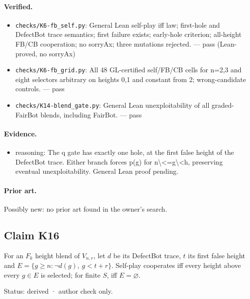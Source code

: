 \documentclass{article}
\begin{document}
\paragraph{Verified.}
\begin{itemize}
\item \texttt{checks/K6-fb\_self.py}: General Lean self-play iff law; first-hole and DefectBot trace semantics; first failure exists; early-hole criterion; all-height FB/CB cooperation; no sorryAx; three mutations rejected. --- pass (Lean-proved, no sorryAx)
\item \texttt{checks/K6-fb\_grid.py}: All 48 GL-certified self/FB/CB cells for n=2,3 and eight selectors arbitrary on heights 0,1 and constant from 2; wrong-candidate controls. --- pass
\item \texttt{checks/K14-blend\_gate.py}: General Lean unexploitability of all graded-FairBot blends, including FairBot. --- pass
\end{itemize}

\paragraph{Evidence.}
\begin{itemize}
\item reasoning: The q gate has exactly one hole, at the first false height of the DefectBot trace. Either branch forces p(g) for n\textbackslash{}\textless{}=g\textbackslash{}\textless{}h, preserving eventual unexploitability. General Lean proof pending.
\end{itemize}

\paragraph{Prior art.} Possibly new: no prior art found in the owner's search.

\subsection*{Claim K16}

For an $F_k$ height blend of $V_{n,r}$, let $d$ be its DefectBot trace, $t$ its first false height and $E=\{g\ge n:\neg d(g),\ g<t+r\}$. Self-play cooperates iff every height above every $g\in E$ is selected; for finite $S$, iff $E=\varnothing$.

Status: derived · author check only.
\end{document}

